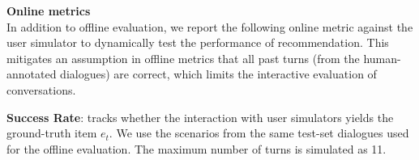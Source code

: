 \textbf{Online metrics}\\
In addition to offline evaluation, we report the following online metric against the user simulator to dynamically test the performance of recommendation. This mitigates an assumption in offline metrics that all past turns (from the human-annotated dialogues) are correct, which limits the interactive evaluation of conversations.

\noindent \textbf{Success Rate}: tracks whether the interaction with user simulators yields the ground-truth item $e_t$. We use the scenarios from the same test-set dialogues used for the offline evaluation. The maximum number of turns is simulated as 11.

\begin{table}[!t]
    \centering
\end{table}
